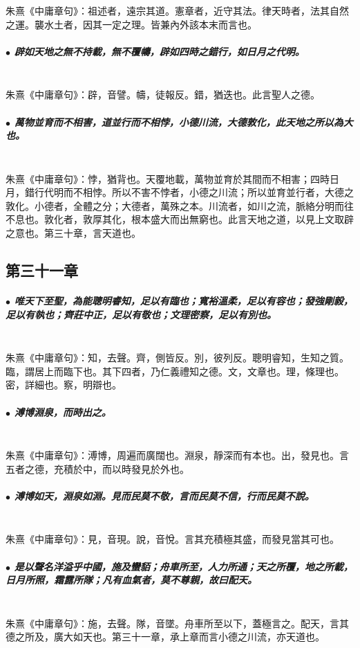 \documentclass[hyperref, UTF8, 12pt, a4paper]{ctexrep}
\begin{document}
朱熹《中庸章句》：祖述者，遠宗其道。憲章者，近守其法。律天時者，法其自然之運。襲水土者，因其一定之理。皆兼內外該本末而言也。

\subparagraph{$\bullet$ 辟如天地之無不持載，無不覆幬，辟如四時之錯行，如日月之代明。} ~\\

朱熹《中庸章句》：辟，音譬。幬，徒報反。錯，猶迭也。此言聖人之德。

\subparagraph{$\bullet$ 萬物並育而不相害，道並行而不相悖，小德川流，大德敦化，此天地之所以為大也。} ~\\

朱熹《中庸章句》：悖，猶背也。天覆地載，萬物並育於其間而不相害；四時日月，錯行代明而不相悖。所以不害不悖者，小德之川流；所以並育並行者，大德之敦化。小德者，全體之分；大德者，萬殊之本。川流者，如川之流，脈絡分明而往不息也。敦化者，敦厚其化，根本盛大而出無窮也。此言天地之道，以見上文取辟之意也。第三十章，言天道也。

\newpage
\subsection{第三十一章}

\subparagraph{$\bullet$ 唯天下至聖，為能聰明睿知，足以有臨也；寬裕溫柔，足以有容也；發強剛毅，足以有執也；齊莊中正，足以有敬也；文理密察，足以有別也。} ~\\

朱熹《中庸章句》：知，去聲。齊，側皆反。別，彼列反。聰明睿知，生知之質。臨，謂居上而臨下也。其下四者，乃仁義禮知之德。文，文章也。理，條理也。密，詳細也。察，明辯也。

\subparagraph{$\bullet$ 溥博淵泉，而時出之。} ~\\

朱熹《中庸章句》：溥博，周遍而廣闊也。淵泉，靜深而有本也。出，發見也。言五者之德，充積於中，而以時發見於外也。

\subparagraph{$\bullet$ 溥博如天，淵泉如淵。見而民莫不敬，言而民莫不信，行而民莫不說。} ~\\

朱熹《中庸章句》：見，音現。說，音悅。言其充積極其盛，而發見當其可也。

\subparagraph{$\bullet$ 是以聲名洋溢乎中國，施及蠻貊；舟車所至，人力所通；天之所覆，地之所載，日月所照，霜露所隊；凡有血氣者，莫不尊親，故曰配天。} ~\\

朱熹《中庸章句》：施，去聲。隊，音墜。舟車所至以下，蓋極言之。配天，言其德之所及，廣大如天也。第三十一章，承上章而言小德之川流，亦天道也。
\end{document}
